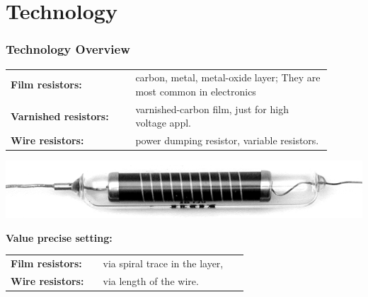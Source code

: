 \documentclass{beamer}
\begin{document}
\section{\texorpdfstring{Technology}{Technology}}
	\begin{frame}
    \frametitle{Technology Overview}
		\begin{center}
		\begin{tabular}{p{0.35\linewidth} p{0.55\linewidth}}
			\textbf{Film resistors:} 	& carbon, metal, metal-oxide layer; They are most common in electronics\\
			\textbf{Varnished resistors:} 	& varnished-carbon film, just for high voltage appl.\\
			\textbf{Wire resistors:} 	& power dumping resistor, variable resistors.\\
		\end{tabular}
		\includegraphics[scale=0.3]{obr06_vrstvovyRez.png}
		\end{center}
		\textbf{Value precise setting:}\\
		\begin{tabular}{p{0.35\linewidth} p{0.55\linewidth}}
			\textbf{Film resistors:} 	& via spiral trace in the layer,\\
			\textbf{Wire resistors:} 	& via length of the wire.\\
		\end{tabular}
  \end{frame}
\end{document}
